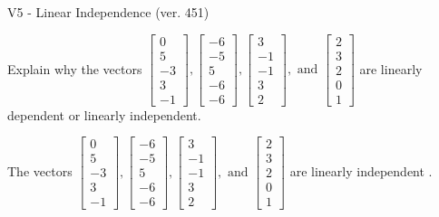 \begin{exercise}
  \begin{exerciseTitle}V5 - Linear Independence (ver. 451)\end{exerciseTitle}
  \begin{exerciseStatement}
    Explain why the vectors \(\left[\begin{array}{r}
0 \\
5 \\
-3 \\
3 \\
-1
\end{array}\right] , \left[\begin{array}{r}
-6 \\
-5 \\
5 \\
-6 \\
-6
\end{array}\right] , \left[\begin{array}{r}
3 \\
-1 \\
-1 \\
3 \\
2
\end{array}\right] , \text{ and } \left[\begin{array}{r}
2 \\
3 \\
2 \\
0 \\
1
\end{array}\right]\) are linearly dependent or linearly independent.	


  \end{exerciseStatement}
  \begin{exerciseAnswer}
   The vectors \(\left[\begin{array}{r}
0 \\
5 \\
-3 \\
3 \\
-1
\end{array}\right] , \left[\begin{array}{r}
-6 \\
-5 \\
5 \\
-6 \\
-6
\end{array}\right] , \left[\begin{array}{r}
3 \\
-1 \\
-1 \\
3 \\
2
\end{array}\right] , \text{ and } \left[\begin{array}{r}
2 \\
3 \\
2 \\
0 \\
1
\end{array}\right]\) are 
  	 linearly independent  .
  


  \end{exerciseAnswer}
\end{exercise}